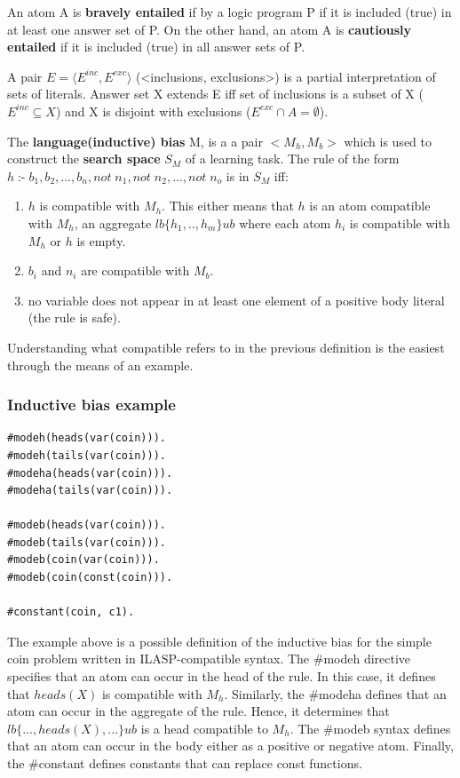An atom A is \textbf{bravely entailed} if by a logic program P if it is included (true) in at least one answer set of P. 
On the other hand, an atom A is \textbf{cautiously entailed} if it is included (true) in all answer sets of P.

A pair $E = \langle E^{inc}, E^{exc} \rangle $ (<inclusions, exclusions>) is a partial interpretation of sets of literals.
Answer set X extends E iff set of inclusions is a subset of X ($E^{inc} \subseteq X$) and X is disjoint with exclusions ($E^{exc} \cap A = \emptyset$).


The \textbf{language(inductive) bias} M, is a a pair $<M_h, M_b>$ which is used to construct the \textbf{search space} $S_M$ of a learning task.
The rule of the form  \\$ h \;\text{:-} \; b_1, b_2, ..., b_n, not\; n_1, not\; n_2, ..., not\; n_o$ is in $S_M$ iff:
\begin{enumerate}
    \item $h$ is compatible with $M_h$. This either means that $h$ is an atom compatible with $M_h$, an aggregate $lb\{h_1,.., h_m\}ub$ where each atom $h_i$ is compatible with $M_h$ or $h$ is empty.
    \item $b_i$ and $n_i$ are compatible with $M_b$.
    \item no variable does not appear in at least one element  of a positive body literal (the rule is safe). \\ 
\end{enumerate}
Understanding what compatible refers to in the previous definition is the easiest through the means of an example.

\subsubsection{Inductive bias example}
\begin{verbatim}
#modeh(heads(var(coin))).
#modeh(tails(var(coin))).
#modeha(heads(var(coin))).
#modeha(tails(var(coin))).

#modeb(heads(var(coin))).
#modeb(tails(var(coin))).
#modeb(coin(var(coin))).
#modeb(coin(const(coin))).

#constant(coin, c1).
\end{verbatim}

The example above is a possible definition of the inductive bias for the simple coin problem written in ILASP-compatible syntax.
The \#modeh directive specifies that an atom can occur in the head of the rule. In this case, it defines that $heads(X)$ is compatible with $M_h$.
Similarly, the \#modeha defines that an atom can occur in the aggregate of the rule. Hence, it determines that  $lb\{..., heads(X), ...\}ub$ is a head compatible to $M_h$.
The \#modeb syntax defines that an atom can occur in the body either as a positive or negative atom.
Finally, the \#constant defines constants that can replace const functions.

